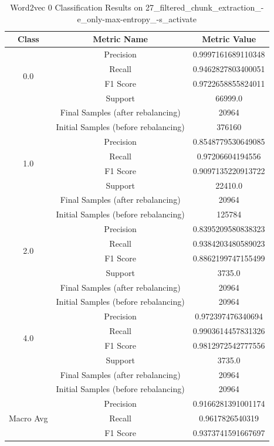 \begin{longtable}{|c|c|c|}
\caption{Word2vec 0 Classification Results on 27\_filtered\_chunk\_extraction\_-e\_only-max-entropy\_-s\_activate} \label{tab:27_filtered_chunk_extraction_-e_only-max-entropy_-s_activate_word2vec_0_classifiers_results} \\
\hline
Class & Metric Name & Metric Value \\
\hline
\multirow{4}{*}{0.0} & Precision & 0.9997161689110348 \\
 & Recall & 0.9462827803400051 \\
 & F1 Score & 0.9722658855824011 \\
 & Support & 66999.0 \\
 & Final Samples (after rebalancing) & 20964 \\
 & Initial Samples (before rebalancing) & 376160 \\
\hline
\multirow{4}{*}{1.0} & Precision & 0.8548779530649085 \\
 & Recall & 0.97206604194556 \\
 & F1 Score & 0.9097135220913722 \\
 & Support & 22410.0 \\
 & Final Samples (after rebalancing) & 20964 \\
 & Initial Samples (before rebalancing) & 125784 \\
\hline
\multirow{4}{*}{2.0} & Precision & 0.8395209580838323 \\
 & Recall & 0.9384203480589023 \\
 & F1 Score & 0.8862199747155499 \\
 & Support & 3735.0 \\
 & Final Samples (after rebalancing) & 20964 \\
 & Initial Samples (before rebalancing) & 20964 \\
\hline
\multirow{4}{*}{4.0} & Precision & 0.972397476340694 \\
 & Recall & 0.9903614457831326 \\
 & F1 Score & 0.9812972542777556 \\
 & Support & 3735.0 \\
 & Final Samples (after rebalancing) & 20964 \\
 & Initial Samples (before rebalancing) & 20964 \\
\hline
\multirow{4}{*}{Macro Avg} & Precision & 0.9166281391001174 \\
 & Recall & 0.9617826540319 \\
 & F1 Score & 0.9373741591667697 \\

\end{longtable}
